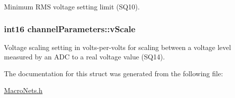 Minimum R\-M\-S voltage setting limit (S\-Q10). \hypertarget{a00003_a7bdcae99eedfaaa8bfda6088cec1c08d}{
\subsubsection[{v\-Scale}]{\setlength{\rightskip}{0pt plus 5cm}int16 channel\-Parameters\-::v\-Scale}}\label{a00003_a7bdcae99eedfaaa8bfda6088cec1c08d}
Voltage scaling setting in volts-\/per-\/volts for scaling between a voltage level measured by an A\-D\-C to a real voltage value (S\-Q14). 

The documentation for this struct was generated from the following file\-:\begin{DoxyCompactItemize}
\item 
\hyperlink{a00021}{Macro\-Nets.\-h}\end{DoxyCompactItemize}
